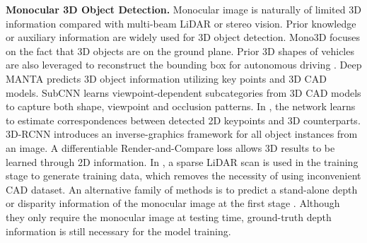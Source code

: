 \documentclass[10pt,twocolumn,letterpaper]{article}
\begin{document}
\vspace{2pt}\noindent\textbf{Monocular 3D Object Detection.}\hspace{5pt}
Monocular image is naturally of limited 3D information compared with multi-beam LiDAR or stereo vision.
Prior knowledge or auxiliary information are widely used for 3D object detection.
Mono3D \cite{chen_monocular_2016} focuses on the fact that 3D objects are on the ground plane.
Prior 3D shapes of vehicles are also leveraged to reconstruct the bounding box for autonomous driving \cite{murthy2017reconstructing}.
Deep MANTA \cite{chabot2017deep} predicts 3D object information utilizing key points and 3D CAD models.
SubCNN \cite{xiang_subcategory-aware_2017} learns viewpoint-dependent subcategories from 3D CAD models to capture both shape, viewpoint and occlusion patterns.
In \cite{barabanau_monocular_2019},  the network learns to estimate correspondences between detected 2D keypoints and 3D counterparts.
3D-RCNN \cite{kundu20183d} introduces an inverse-graphics framework for all object instances from an image. A differentiable Render-and-Compare loss allows 3D results to be learned through 2D information.
In \cite{ku_monocular_2019}, a sparse LiDAR scan is used in the training stage to generate training data, which removes the necessity of using inconvenient CAD dataset.
An alternative family of methods is to predict a stand-alone depth or disparity information of the monocular image at the first stage \cite{ma_accurate_2019, manhardt_roi_10d_2018, wang_pseudo-lidar_2018, xu_multilevel_2018}. Although they only require the monocular image at testing time, ground-truth depth information is still necessary for the model training.
\end{document}
